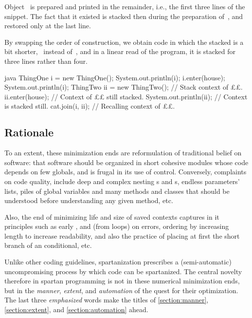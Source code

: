 \begin{enumerate}
  Object~ is prepared and printed in the remainder, i.e., the first three
  lines of the snippet. The fact that it existed is stacked then during the
  preparation of~, and restored only at the last line.

  By swapping the order of construction, we obtain code in which the stacked is
  a bit shorter,~ instead of~, and in a linear read of the
  program, it is stacked for three lines rather than four.

\begin{code}[minipage,width=54ex]{java}
ThingOne i = new ThingOne();
System.out.println(i);
i.enter(house);
System.out.println(i);
ThingTwo ii = new ThingTwo(); // Stack context of ££.
ii.enter(house); // Context of ££ still stacked.
System.out.println(ii); // Context is stacked still.
cat.join(i, ii); // Recalling context of ££.
  \end{code}
\end{enumerate}

\subsection{Rationale}
\label{section:rationale}
To an extent, these minimization ends are reformulation of traditional belief
on software: that software should be organized in short cohesive modules whose
code depends on few globals, and is frugal in its use of control. Conversely,
complaints on code quality, include deep and complex nesting s and
s, endless parameters' lists, piles of global variables and many
methods and classes that should be understood before understanding any given
method, etc.

Also, the end of minimizing life and size of saved contexts captures in it
principles such as early ,  and  (from loops) on
errors, ordering by increasing length to increase readability, and also the
practice of placing at first the short branch of an  conditional, etc.

Unlike other coding guidelines, spartanization prescribes a (semi-automatic)
uncompromising process by which code can be spartanized. The central novelty
therefore in spartan programming is not in these numerical minimization ends,
but in the \emph{manner}, \emph{extent}, and \emph{automation} of the quest
for their optimization. The last three \emph{emphasized} words make the titles
of \cref{section:manner}, \cref{section:extent}, and \cref{section:automation}
ahead.

